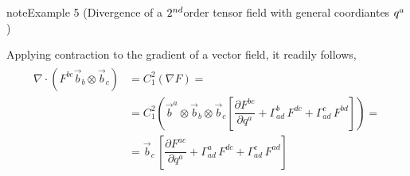 \documentclass[letterpaper,10pt,english]{jupyterBook}
\begin{document}
\begin{sphinxadmonition}{note}{Example 5 (Divergence of a \protect\(2^{nd}\protect\)\sphinxhyphen{}order tensor field \sphinxhyphen{} with general coordiantes \protect\(q^{a}\protect\))}



\sphinxAtStartPar
Applying contraction to the gradient of a vector field, it readily follows,
\begin{equation*}
\begin{split}\begin{aligned}
  \nabla \cdot \left( F^{bc} \vec{b}_b \otimes \vec{b}_c \right)
  & = C_{1}^{2} \left( \nabla F \right) = \\
  & = C_1^2 \left( \vec{b}^a \otimes \vec{b}_b \otimes \vec{b}_c \left[ \dfrac{\partial F^{bc}}{\partial q^a} + \Gamma_{ad}^b \, F^{dc} + \Gamma^{c}_{ad} \, F^{bd}  \right]  \right) = \\
  & = \vec{b}_c \, \left[ \dfrac{\partial F^{ac}}{\partial q^a} + \Gamma_{ad}^a \, F^{dc} + \Gamma^{c}_{ad} \, F^{ad}  \right] 
\end{aligned}\end{split}
\end{equation*}\end{sphinxadmonition}
\end{document}
